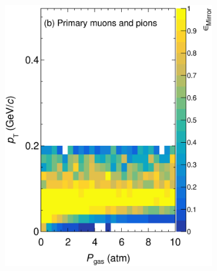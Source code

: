 \begin{figure}[!ht]
\begin{subfigure}[b]{0.32\textwidth}
         \includegraphics[width=\textwidth]{figures/ch5-KF_NDGAr/ToySample/ParScan/testTPCMirrorMirrorRatioVSpTVSdens_mupi.eps}
         \caption{}
         \label{fig:MirrorRatio_Prim_mu}
     \end{subfigure}
          \begin{subfigure}[b]{0.32\textwidth}
         \centering

\end{subfigure}
\end{figure}
